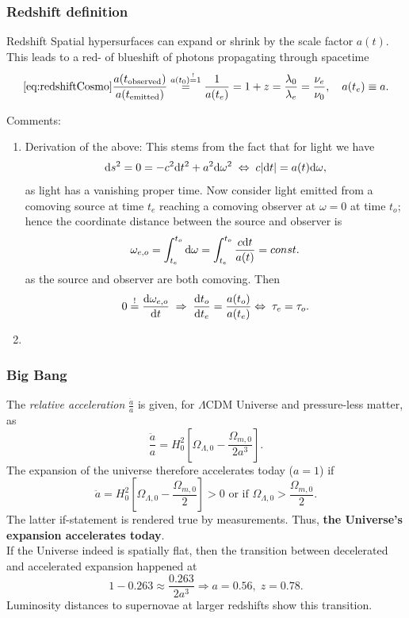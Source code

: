 \subsubsection{Redshift definition}
\begin{mybox}{Redshift}
Spatial hypersurfaces can expand or shrink by the scale factor $a(t)$. This leads to a red- of blueshift of photons propagating through spacetime
\begin{equation}
	\ref{eq:redshiftCosmo}
	\frac{a(t_{\text{observed}})}{a(t_{\text{emitted}})} \stackrel{ a(t_0)\stackrel{!}{=}1}{=} \frac{1}{a(t_e)} = 1+z = \frac{\lambda_0}{\lambda_e} = \frac{\nu_e}{\nu_0},\quad a(t_e)\equiv a.
\end{equation}\end{mybox}
Comments:
\begin{enumerate} 
	\item Derivation of the above:
This stems from the fact that for light we have
\begin{equation}
	\mathrm{d} s^2 =0 =-c^2 \mathrm{d} t^2+a^2 \mathrm{d} \omega^2\; \Leftrightarrow \; c\abs{\mathrm{d} t} = a(t) \mathrm{d} \omega,
\end{equation}
as light has a vanishing proper time. Now consider light emitted from a comoving source at time $t_e$ reaching a comoving observer at $\omega=0$ at time $t_o$; hence the coordinate distance between the source and observer is
\begin{equation*}
\omega_{e,o} = \int_{t_e}^{t_o} \mathrm{d} \omega = \int_{t_e}^{t_o}  \frac{c \mathrm{d} t}{a(t)} = const.
\end{equation*}
as the source and observer are both comoving. Then
\begin{equation*}
0 \stackrel{!}{=} \frac{\mathrm{d} \omega_{e,o}}{\mathrm{d} t} \; \Rightarrow \; \frac{\mathrm{d} t_o}{\mathrm{d} t_e} = \frac{a(t_o)}{a(t_e)} \Leftrightarrow \; \tau_e=\tau_o.
\end{equation*}
\item 
\end{enumerate}
\subsubsection{Big Bang}
The \emph{relative acceleration} $\frac{\ddot{a}}{a}$ is given, for $\Lambda$CDM Universe and pressure-less matter, as
\begin{equation}
\frac{\ddot{a}}{a} = H^2_0 \left[\Omega_{\Lambda,0}-\frac{\Omega_{m,0}}{2 a^3}\right].
\end{equation}
The expansion of the universe therefore accelerates today ($a=1$) if
\begin{equation}
\ddot{a} = H^2_0 \left[\Omega_{\Lambda,0}-\frac{\Omega_{m,0}}{2}\right]>0 \text{ or if } \Omega_{\Lambda,0} > \frac{\Omega_{m,0}}{2}.
\end{equation}
The latter if-statement is rendered true by measurements. Thus, \textbf{the Universe's expansion accelerates today}.\\
If the Universe indeed is spatially flat, then the transition between decelerated and accelerated expansion happened at
\begin{equation}
	1-0.263 \approx \frac{0.263}{2 a^3} \Rightarrow a = 0.56, \; z=0.78.
\end{equation}
Luminosity distances to supernovae at larger redshifts show this transition.

